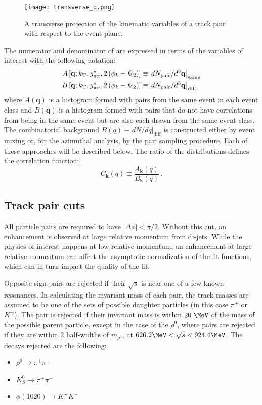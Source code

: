 \begin{figure}[t]
  \centering
  \texttt{[image: transverse\_q.png]}
  \caption{A transverse projection of the kinematic variables of a track pair with respect to the event plane.}
\label{fig:transverse_q}
\end{figure}

The numerator and denominator of \Eqn{\ref{eq:corr_deff}} are expressed in terms of the variables of interest with the following notation:
\begin{align}
  A\left[\mathbf{q};k_\mathrm{T}, y^{\star}_{\pi\pi}, 2\left(\phi_{k}-\Psi_{2}\right)\right] &\equiv \left. dN_\textrm{pair}/d^3 \mathbf{q} \right|_{\textrm{same}} \\
  B\left[\mathbf{q};k_\mathrm{T}, y^{\star}_{\pi\pi}, 2\left(\phi_{k}-\Psi_{2}\right)\right] &\equiv \left. dN_\textrm{pair}/d^3 \mathbf{q} \right|_{\textrm{diff}}
\end{align}
where $A(\mathbf{q})$ is a histogram formed with pairs from the same event in each event class and $B(\mathbf{q})$ is a histogram formed with pairs that do not have correlations from being in the same event but are also each drawn from the same event class.
The combinatorial background $B(q) \equiv \left. dN/dq \right|_{\textrm{diff}}$ is constructed either by event mixing or, for the azimuthal analysis, by the pair sampling procedure.
Each of these approaches will be described below.
The ratio of the distributions defines the correlation function:
\begin{equation}
  \label{eq:same_over_mixed}
  C_{\mathbf{k}}(q) \equiv \frac{A_{\mathbf{k}}(q)}{B_{\mathbf{k}}(q)} \,.
\end{equation}

\subsection{Track pair cuts}
All particle pairs are required to have $\left| \Delta \phi \right| < \pi/2$.
Without this cut, an enhancement is observed at large relative momentum from di-jets.
While the physics of interest happens at low relative momentum, an enhancement at large relative momentum can affect the asymptotic normalization of the fit functions, which can in turn impact the quality of the fit.

Opposite-sign pairs are rejected if their $\sqrt{s}$ is near one of a few known resonances.
In calculating the invariant mass of each pair, the track masses are assumed to be one of the sets of possible daughter particles (in this case $\pi^{\pm}$ or $K^{\pm}$).
The pair is rejected if their invariant mass is within $20~\MeV$ of the mass of the possible parent particle, except in the case of the $\rho^{0}$, where pairs are rejected if they are within 2 half-widths of $m_{\rho^{0}}$, at $626.2 \MeV < \sqrt{s} < 924.4 \MeV$.
The decays rejected are the following:
\begin{itemize}
\item
  $\rho^{0} \rightarrow \pi^{+} \pi^{-}$
\item
  $K^{0}_{S} \rightarrow \pi^{+} \pi^{-}$
\item
  $\phi(1020) \rightarrow K^{+} K^{-}$
\end{itemize}

